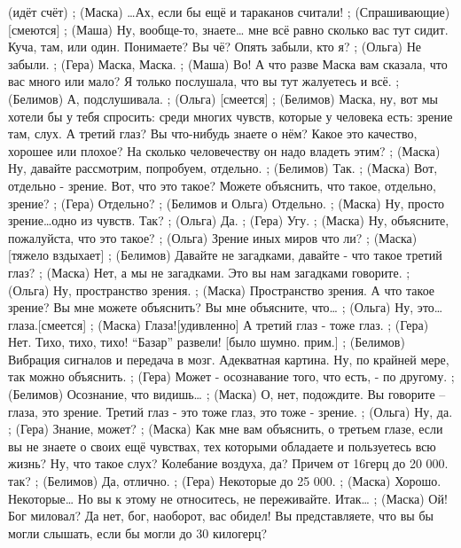 (идёт счёт)
;	(Маска) …Ах, если бы ещё и тараканов считали!
;	(Спрашивающие)[смеются]
;	(Маша) Ну, вообще-то, знаете… мне всё равно сколько вас тут сидит. Куча, там, или один. Понимаете?  Вы чё? Опять забыли, кто я?
;	(Ольга) Не забыли.
;	(Гера) Маска, Маска.
;	(Маша) Во! А что разве Маска вам сказала, что вас много или мало? Я только послушала, что вы тут жалуетесь и всё. 
;	(Белимов) А, подслушивала.
;	(Ольга) [смеется]
;	(Белимов) Маска, ну, вот мы хотели бы у тебя спросить: среди многих чувств, которые у человека есть: зрение там, слух. А третий глаз? Вы что-нибудь знаете о нём? Какое это качество, хорошее или плохое? На сколько человечеству он надо владеть этим?
;	(Маска) Ну, давайте рассмотрим, попробуем, отдельно. 
;	(Белимов) Так.
;	(Маска) Вот, отдельно - зрение. Вот, что это такое? Можете объяснить, что такое, отдельно, зрение?
;	(Гера) Отдельно?
;	(Белимов и Ольга) Отдельно.
;	(Маска) Ну, просто зрение…одно из чувств. Так?
;	(Ольга) Да.
;	(Гера) Угу.
;	(Маска) Ну, объясните, пожалуйста, что это такое? 
;	(Ольга) Зрение иных миров что ли?
;	(Маска) [тяжело вздыхает]
;	(Белимов) Давайте не загадками, давайте -  что такое третий глаз? 
;	(Маска) Нет, а мы не загадками. Это вы нам загадками говорите. 
;	(Ольга) Ну, пространство зрения.
;	(Маска) Пространство зрения. А что такое зрение? Вы мне можете объяснить? Вы мне объясните, что…
;	(Ольга) Ну, это…глаза.[смеется]
;	(Маска) Глаза![удивленно] А третий глаз - тоже глаз. 
;	(Гера) Нет. Тихо, тихо, тихо! ``Базар'' развели! [было шумно. прим.]
;	(Белимов)  Вибрация сигналов и передача в мозг. Адекватная картина. Ну, по крайней мере, так можно объяснить. 
;	(Гера) Может - осознавание того, что есть, - по другому.
;	(Белимов) Осознание, что видишь…
;	(Маска) О, нет, подождите. Вы говорите – глаза, это зрение. Третий глаз -  это тоже глаз, это тоже - зрение. 
;	(Ольга) Ну, да.
;	(Гера) Знание, может?
;	(Маска) Как мне вам объяснить, о третьем глазе, если вы не знаете о своих ещё чувствах, тех которыми обладаете и пользуетесь всю жизнь? Ну, что такое слух? Колебание воздуха, да? Причем от 16герц  до 20 000. так?
;	(Белимов) Да, отлично.
;	(Гера) Некоторые до 25 000.
;	(Маска) Хорошо. Некоторые… Но вы к этому не относитесь, не переживайте. Итак…
;	(Маска) Ой! Бог миловал? Да нет, бог, наоборот, вас обидел! Вы представляете, что вы бы могли слышать, если бы могли до 30 килогерц?
